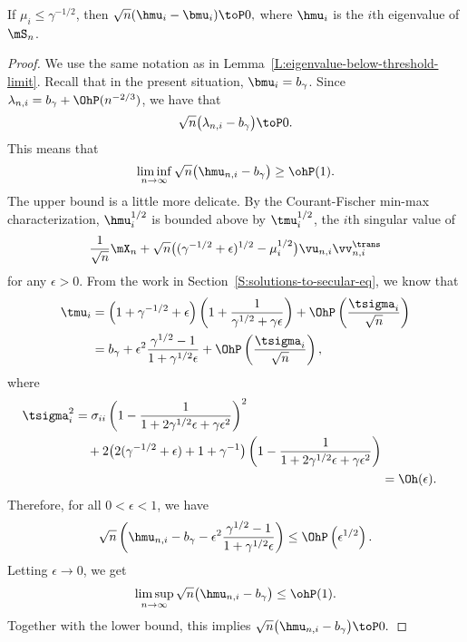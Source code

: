 \begin{lemma}
    If $\mu_i \leq \gamma^{-1/2}$, then
    \(
        \sqrt{n} ( \hmu_i - \bmu_i ) \toP 0,
    \)
    where $\hmu_i$ is the $i$th eigenvalue of $\mS_n$.
\end{lemma}
\begin{proof}
We use the same notation as in Lemma~\ref{L:eigenvalue-below-threshold-limit}.
Recall that in the present situation, $\bmu_i = b_\gamma$.
Since $\lambda_{n,i} = b_\gamma + \OhP(n^{-2/3})$, we have that
\[
    \sqrt{n} \big( \lambda_{n,i} - b_\gamma \big) \toP 0.
\]
This means that
\[
    \liminf_{n\to\infty} \sqrt{n} \big( \hmu_{n,i} - b_\gamma \big)
        \geq \ohP(1).
\]
The upper bound is a little more delicate.  By the Courant-Fischer min-max
characterization, $\hmu_i^{1/2}$ is bounded above by $\tmu_i^{1/2}$, the 
$i$th singular value of
\[
    \frac{1}{\sqrt{n}} \mX_n 
    + 
    \sqrt{n} \big( (\gamma^{-1/2} + \epsilon)^{1/2} - \mu_i^{1/2} \big)
    \vu_{n,i} \vv_{n,i}^\trans
\]
for any $\epsilon > 0$.  From the work in  Section~\ref{S:solutions-to-secular-eq}, we know that
\begin{align*}
    \tmu_i
        &=
            \left(
                1 + \gamma^{-1/2} + \epsilon
            \right)
            \left(
                1
                +
                \frac{ 1 }
                     { \gamma^{1/2} + \gamma \epsilon }
            \right)
            +
            \OhP \left(
                \frac{\tsigma_i}{ \sqrt{n} }
            \right) \\
        &=
            b_\gamma
            +
            \epsilon^2
            \frac{ \gamma^{1/2} - 1 }{ 1 + \gamma^{1/2} \epsilon }
            +
            \OhP \left(
                \frac{\tsigma_i}{ \sqrt{n} }
            \right),
\end{align*}
where
\begin{align*}
    \begin{split}
    \tsigma_i^2
    &=
    \sigma_{ii}
    \left(
        1 - \frac{1}{1 + 2 \gamma^{1/2} \epsilon + \gamma \epsilon^2}
    \right)^2 \\
    &\quad+
    2\big( 2 (\gamma^{-1/2} + \epsilon)  + 1 + \gamma^{-1} \big)
    \left(
        1 - \frac{1}{1 + 2 \gamma^{1/2} \epsilon + \gamma \epsilon^2}    
    \right)
    \end{split} \\
    &= \Oh( \epsilon ).
\end{align*}
Therefore, for all $0 < \epsilon < 1$, we have
\[
    \sqrt{n}
    \left(
        \hmu_{n,i}
        - 
        b_\gamma 
        - \epsilon^2
        \frac{ \gamma^{1/2} - 1 }{ 1 + \gamma^{1/2} \epsilon }
    \right)
    \leq
    \OhP \left( \epsilon^{1/2} \right).
\]
Letting $\epsilon \to 0$, we get
\[
    \limsup_{n\to\infty} 
        \sqrt{n}
        \big(
            \hmu_{n,i}
            -
            b_\gamma
        \big)
        \leq
        \ohP(1).
\]
Together with the lower bound, this implies
\(
    \sqrt{n}
    \big(
        \hmu_{n,i}
        -
        b_\gamma
    \big)
    \toP
    0.
\)
\end{proof}

